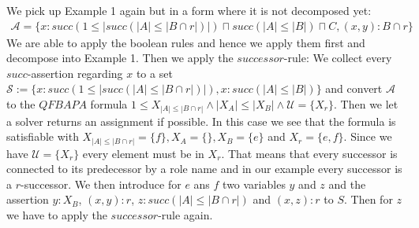 \documentclass[a4paper,11pt]{scrartcl}
\theoremstyle{break}
\theoremstyle{definition}
\begin{document}
We pick up Example 1 again but in a form where it is not decomposed yet:
\begin{align*}
\mathcal{A}=\{x:succ(1\leq|succ(|A|\leq|B\cap r|)|)\sqcap succ(|A|\leq |B|)\sqcap C, (x,y):B\cap r\}
\end{align*}
We are able to apply the boolean rules and hence we apply them first and decompose into Example 1. Then we apply the $successor$-rule: We collect every $succ$-assertion regarding $x$ to a set $\mathcal{S}:=\{x:succ(1\leq|succ(|A|\leq|B\cap r|)|), x:succ(|A|\leq |B|)\}$ and convert $\mathcal{A}$ to the $QFBAPA$ formula $1\leq X_{|A|\leq|B\cap r|}\wedge|X_A|\leq |X_B|\wedge \mathcal{U}=\{X_r\}$. Then we let a solver returns an assignment if possible. In this case we see that the formula is satisfiable with $X_{|A|\leq|B\cap r|}=\{f\},X_A=\{\},X_B=\{e\}$ and $X_r=\{e,f\}$. Since we have $\mathcal{U}=\{X_r\}$ every element must be in $X_r$. That means that every successor is connected to its predecessor by a role name and in our example every successor is a $r$-successor. We then introduce for $e$ ans $f$ two variables $y$ and $z$ and the assertion $y:X_B$, $(x,y):r$, $z:succ(|A|\leq|B\cap r|)$ and $(x,z):r$ to $S$. Then for $z$ we have to apply the $successor$-rule again.
\end{document}
